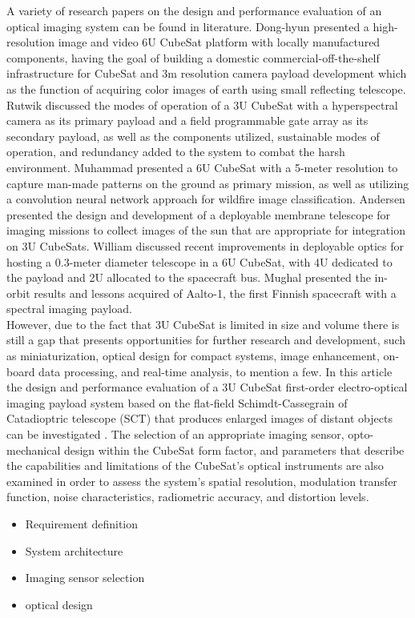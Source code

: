 \documentclass[final,5p,times,sort&compress,twocolumn]{elsarticle}
\begin{document}
A variety of research papers on the design and performance evaluation of an optical imaging system can be found in literature. Dong-hyun \citep{cho2019high} presented a high-resolution image and video 6U CubeSat platform with locally manufactured components, having the goal of building a domestic commercial-off-the-shelf infrastructure for CubeSat and 3m resolution camera payload development which as the function of acquiring color images of earth using small reflecting telescope. Rutwik \citep{jain2018modes} discussed the modes of operation of a 3U CubeSat with a hyperspectral camera as its primary payload and a field programmable gate array as its secondary payload, as well as the components utilized, sustainable modes of operation, and redundancy added to the system to combat the harsh environment.  Muhammad \citep{azami2022earth} presented a 6U CubeSat with a 5-meter resolution to capture man-made patterns on the ground as  primary mission, as well as utilizing a convolution neural network approach for wildfire image classification. Andersen \citep{dearborn2014deployable} presented the design and development of a deployable membrane telescope for imaging missions to collect images of the sun that are appropriate for integration on 3U CubeSats. William \citep{schwartz2022}discussed recent improvements in deployable optics for hosting a 0.3-meter diameter telescope in a 6U CubeSat, with 4U dedicated to the payload and 2U allocated to the spacecraft bus. Mughal \citep{mughal2021aalto} presented the in-orbit results and lessons acquired of Aalto-1, the first Finnish spacecraft with a spectral imaging payload.  \\
However, due to the fact that 3U CubeSat is limited in size and volume there is still a gap that presents opportunities for further research and development, such as miniaturization, optical design for compact systems, image enhancement, on-board data processing, and real-time analysis, to mention a few. In this article the design and performance evaluation of a 3U CubeSat first-order electro-optical imaging payload system based on the flat-field Schimdt-Cassegrain of Catadioptric telescope (SCT) that produces enlarged images of distant objects can be investigated . The selection of an appropriate imaging sensor, opto-mechanical design within the CubeSat form factor, and parameters that describe the capabilities and limitations of the CubeSat's optical instruments are also examined in order to assess the system's spatial resolution, modulation transfer function, noise characteristics, radiometric accuracy, and distortion levels.
\begin{itemize}
	\item Requirement definition
	\item System architecture
	\item Imaging sensor selection
	\item optical design
\end{itemize} 
\end{document}
